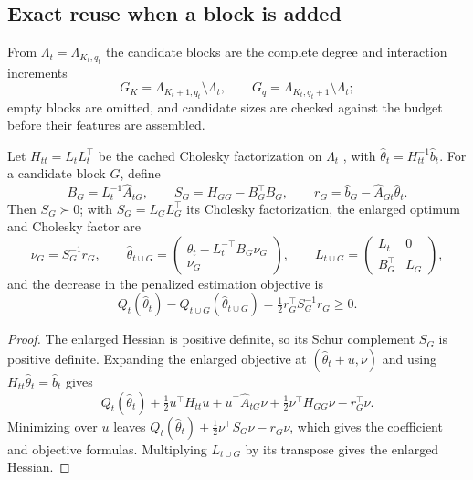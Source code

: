 \documentclass[supplement,review,hidelinks,onefignum,onetabnum]{siamart251216}
\begin{document}
\subsection{Exact reuse when a block is added}

From $\Lambda_t = \Lambda_{K_t,q_t}$ the candidate blocks are the complete degree and interaction increments
\[
  G_K = \Lambda_{K_t+1,q_t}\setminus\Lambda_t, \qquad G_q = \Lambda_{K_t,q_t+1}\setminus\Lambda_t;
\]
empty blocks are omitted, and candidate sizes are checked against the budget before their features are assembled.

\begin{proposition}
\label{prop:sm2-block}
Let $H_{tt} = L_tL_t^\top$ be the cached Cholesky factorization on $\Lambda_t$ \cite{GolubVanLoan2013}, with $\widehat\theta_t = H_{tt}^{-1}\widehat b_t$. For a candidate block $G$, define
\[
  B_G = L_t^{-1}\widehat A_{tG}, \qquad S_G = H_{GG} - B_G^\top B_G, \qquad r_G = \widehat b_G - \widehat A_{Gt}\widehat\theta_t.
\]
Then $S_G \succ 0$; with $S_G = L_GL_G^\top$ its Cholesky factorization, the enlarged optimum and Cholesky factor are
\begin{equation}
  \nu_G = S_G^{-1}r_G, \qquad
  \widehat\theta_{t\cup G} = \begin{pmatrix}\widehat\theta_t - L_t^{-\top}B_G\nu_G\\ \nu_G\end{pmatrix}, \qquad
  L_{t\cup G} = \begin{pmatrix}L_t & 0\\ B_G^\top & L_G\end{pmatrix},
  \label{eq:sm2-deltatheta}
\end{equation}
and the decrease in the penalized estimation objective is
\begin{equation}
  Q_t(\widehat\theta_t) - Q_{t\cup G}(\widehat\theta_{t\cup G}) = \tfrac12 r_G^\top S_G^{-1}r_G \ge 0.
  \label{eq:sm2-deltaj}
\end{equation}
\end{proposition}

\begin{proof}
The enlarged Hessian is positive definite, so its Schur complement $S_G$ is positive definite. Expanding the enlarged objective at $(\widehat\theta_t + u, \nu)$ and using $H_{tt}\widehat\theta_t = \widehat b_t$ gives
\[
  Q_t(\widehat\theta_t) + \tfrac12u^\top H_{tt}u + u^\top\widehat A_{tG}\nu + \tfrac12\nu^\top H_{GG}\nu - r_G^\top\nu.
\]
Minimizing over $u$ leaves $Q_t(\widehat\theta_t) + \tfrac12\nu^\top S_G\nu - r_G^\top\nu$, which gives the coefficient and objective formulas. Multiplying $L_{t\cup G}$ by its transpose gives the enlarged Hessian.
\end{proof}
\end{document}

